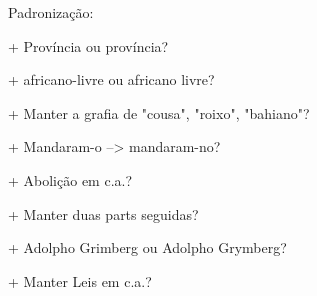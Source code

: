 Padronização:

+ Província ou província?

+ africano-livre ou africano livre?

+ Manter a grafia de "cousa", "roixo", "bahiano"?

+ Mandaram-o --> mandaram-no?

+ Abolição em c.a.?

+ Manter duas parts seguidas?


+ Adolpho Grimberg ou Adolpho Grymberg?

+ Manter Leis em c.a.?
